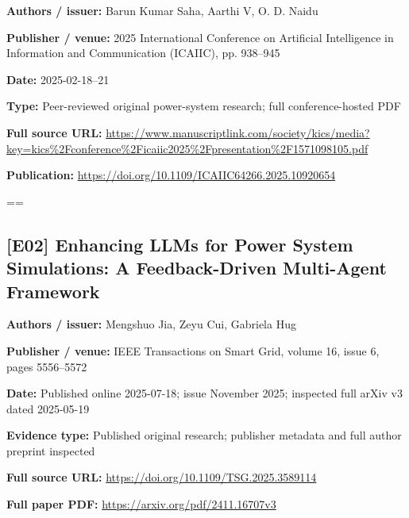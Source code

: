 \documentclass[10pt,letterpaper]{article}
\begin{document}
\textbf{Authors / issuer:} Barun Kumar Saha, Aarthi V, O. D. Naidu\par
\textbf{Publisher / venue:} 2025 International Conference on Artificial Intelligence in Information and Communication (ICAIIC), pp. 938--945\par
\textbf{Date:} 2025-02-18--21\par
\textbf{Type:} Peer-reviewed original power-system research; full conference-hosted PDF\par
\textbf{Full source URL:} \href{https://www.manuscriptlink.com/society/kics/media?key=kics\%2Fconference\%2Ficaiic2025\%2Fpresentation\%2F1571098105.pdf}{\small\ttfamily https:/\allowbreak{}/\allowbreak{}www.\allowbreak{}manuscriptlink.\allowbreak{}com/\allowbreak{}society/\allowbreak{}kics/\allowbreak{}media?\allowbreak{}key=\allowbreak{}kics\%\allowbreak{}2Fconference\%\allowbreak{}2Ficaiic2025\%\allowbreak{}2Fpresentation\%\allowbreak{}2F1571098105.\allowbreak{}pdf}\par
\textbf{Publication:} \href{https://doi.org/10.1109/ICAIIC64266.2025.10920654}{\small\ttfamily https:/\allowbreak{}/\allowbreak{}doi.\allowbreak{}org/\allowbreak{}10.\allowbreak{}1109/\allowbreak{}ICAIIC64266.\allowbreak{}2025.\allowbreak{}10920654}\par
\egroup\par\noindent\box\readingEntry\par\medskip
\setbox\readingEntry=\vbox\bgroup\hsize=\linewidth\subsection*{[E02] Enhancing LLMs for Power System Simulations: A Feedback-Driven Multi-Agent Framework}
\textbf{Authors / issuer:} Mengshuo Jia, Zeyu Cui, Gabriela Hug\par
\textbf{Publisher / venue:} IEEE Transactions on Smart Grid, volume 16, issue 6, pages 5556--5572\par
\textbf{Date:} Published online 2025-07-18; issue November 2025; inspected full arXiv v3 dated 2025-05-19\par
\textbf{Evidence type:} Published original research; publisher metadata and full author preprint inspected\par
\textbf{Full source URL:} \href{https://doi.org/10.1109/TSG.2025.3589114}{\small\ttfamily https:/\allowbreak{}/\allowbreak{}doi.\allowbreak{}org/\allowbreak{}10.\allowbreak{}1109/\allowbreak{}TSG.\allowbreak{}2025.\allowbreak{}3589114}\par
\textbf{Full paper PDF:} \href{https://arxiv.org/pdf/2411.16707v3}{\small\ttfamily https:/\allowbreak{}/\allowbreak{}arxiv.\allowbreak{}org/\allowbreak{}pdf/\allowbreak{}2411.\allowbreak{}16707v3}\par
\end{document}
